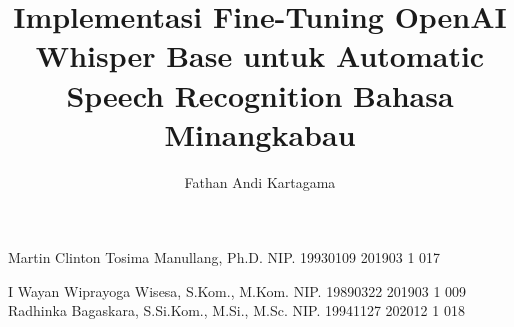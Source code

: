 \documentclass[article]{report} %
\begin{document}
    
    \title{Implementasi Fine-Tuning OpenAI Whisper Base untuk Automatic Speech Recognition Bahasa Minangkabau}
    
	\author{Fathan Andi Kartagama}		%
	
	\dosbingA%
		{Martin Clinton Tosima Manullang, Ph.D.}%
		{NIP. 19930109 201903 1 017}	%

	\pengujiA%
		{I Wayan Wiprayoga Wisesa, S.Kom., M.Kom.}%
		{NIP. 19890322 201903 1 009}	%
	\pengujiB%
		{Radhinka Bagaskara, S.Si.Kom., M.Si., M.Sc.}%
		{NIP. 19941127 202012 1 018}	%

	\sloppy %
    \setcounter{page}{1} %
\end{document}
